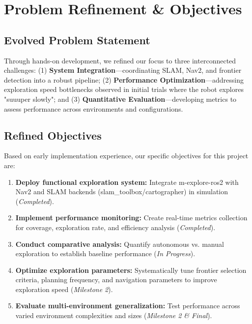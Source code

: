 \documentclass[conference]{IEEEtran}
\begin{document}
\section{Problem Refinement \& Objectives}

\subsection{Evolved Problem Statement}

Through hands-on development, we refined our focus to three interconnected challenges: (1) \textbf{System Integration}—coordinating SLAM, Nav2, and frontier detection into a robust pipeline; (2) \textbf{Performance Optimization}—addressing exploration speed bottlenecks observed in initial trials where the robot explores "suuuper slowly"; and (3) \textbf{Quantitative Evaluation}—developing metrics to assess performance across environments and configurations.

\subsection{Refined Objectives}

Based on early implementation experience, our specific objectives for this project are:

\begin{enumerate}
\item \textbf{Deploy functional exploration system:} Integrate m-explore-ros2 with Nav2 and SLAM backends (slam\_toolbox/cartographer) in simulation (\textit{Completed}).

\item \textbf{Implement performance monitoring:} Create real-time metrics collection for coverage, exploration rate, and efficiency analysis (\textit{Completed}).

\item \textbf{Conduct comparative analysis:} Quantify autonomous vs. manual exploration to establish baseline performance (\textit{In Progress}).

\item \textbf{Optimize exploration parameters:} Systematically tune frontier selection criteria, planning frequency, and navigation parameters to improve exploration speed (\textit{Milestone 2}).

\item \textbf{Evaluate multi-environment generalization:} Test performance across varied environment complexities and sizes (\textit{Milestone 2 \& Final}).
\end{enumerate}
\end{document}
